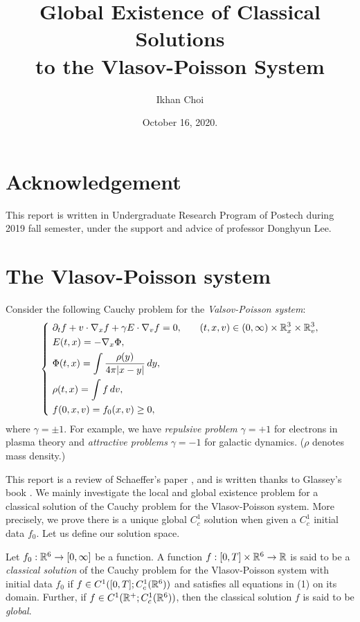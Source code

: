 \documentclass{article}
\title{Global Existence of Classical Solutions\\to the Vlasov-Poisson System}
\author{Ikhan Choi}
\date{October 16, 2020.}
\begin{document}
\maketitle
\tableofcontents

\section*{Acknowledgement}
This report is written in Undergraduate Research Program of Postech during 2019 fall semester, under the support and advice of professor Donghyun Lee.


\clearpage
\section{The Vlasov-Poisson system}
Consider the following Cauchy problem for the \emph{Valsov-Poisson system}:
\begin{align}
\left\{\ \begin{alignedat}{2}
&\pd_tf+v\cdot\nabla_xf+\gamma E\cdot\nabla_vf=0,&&\qquad(t,x,v)\in(0,\infty)\times\R_x^3\times\R_v^3,\\
&E(t,x)=-\nabla_x\Phi,\\
&\Phi(t,x)=\int\frac{\rho(y)}{4\pi|x-y|}\,dy,\\
&\rho(t,x)=\int f\,dv,\\
&f(0,x,v)=f_0(x,v)\ge0,
\end{alignedat}\right.
\end{align}
where $\gamma=\pm1$.
For example, we have \emph{repulsive problem} $\gamma=+1$ for electrons in plasma theory and \emph{attractive problems} $\gamma=-1$ for galactic dynamics.
($\rho$ denotes mass density.)

This report is a review of Schaeffer's paper \cite{schaeffer1991global}, and is written thanks to Glassey's book \cite{glassey1996cauchy}.
We mainly investigate the local and global existence problem for a classical solution of the Cauchy problem for the Vlasov-Poisson system.
More precisely, we prove there is a unique global $C_c^1$ solution when given a $C_c^1$ initial data $f_0$.
Let us define our solution space.

\begin{defn*}
Let $f_0:\mathbb{R}^6\to[0,\infty]$ be a function.
A function $f:[0,T]\times\mathbb{R}^6\to\mathbb{R}$ is said to be a \emph{classical solution} of the Cauchy problem for the Vlasov-Poisson system with initial data $f_0$ if $f\in C^1([0,T];C_c^1(\mathbb{R}^6))$ and satisfies all equations in (1) on its domain.
Further, if $f\in C^1(\mathbb{R}^+;C_c^1(\mathbb{R}^6))$, then the classical solution $f$ is said to be \emph{global}.
\end{defn*}
\end{document}
